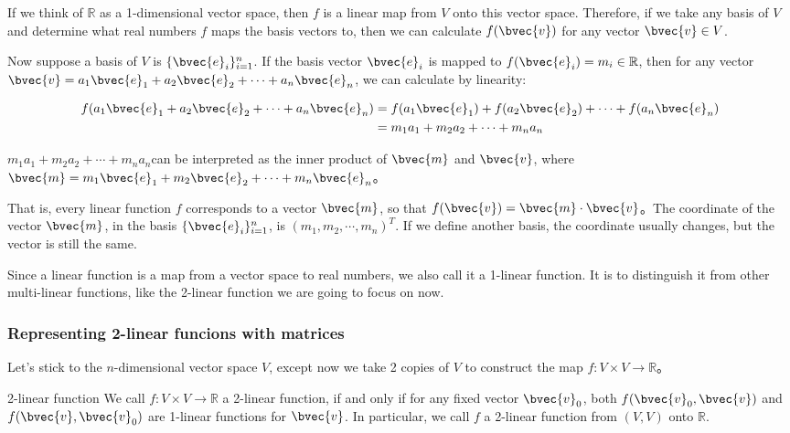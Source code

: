 If we think of $\mathbb{R}$ as a 1-dimensional vector space, then $f$ is a linear map from $V$ onto this vector space. Therefore, if we take any basis of $V$ and determine what real numbers $f$ maps the basis vectors to, then we can calculate $f(\bvec{v})$ for any vector $\bvec{v}\in V$. 

Now suppose a basis of $V$ is $\{\bvec{e}_i\}^n_{i=1}$. If the basis vector $\bvec{e}_i$ is mapped to $f(\bvec{e}_i)=m_i\in\mathbb{R}$, then for any vector $\bvec{v}=a_1\bvec{e}_1+a_2\bvec{e}_2+\cdots+a_n\bvec{e}_n$, we can calculate by linearity: 

\begin{equation}
\begin{aligned}
f(a_1\bvec{e}_1+a_2\bvec{e}_2+\cdots+a_n\bvec{e}_n)&=f(a_1\bvec{e}_1)+f(a_2\bvec{e}_2)+\cdots+f(a_n\bvec{e}_n)\\&=m_1a_1+m_2a_2+\cdots+m_na_n
\end{aligned}
\end{equation}


$m_1a_1+m_2a_2+\cdots+m_na_n$can be interpreted as the inner product of $\bvec{m}$ and $\bvec{v}$, where$\bvec{m}=m_1\bvec{e}_1+m_2\bvec{e}_2+\cdots+m_n\bvec{e}_n$。

That is, every linear function $f$ corresponds to a vector $\bvec{m}$, so that $f(\bvec{v})=\bvec{m}\cdot\bvec{v}$。The coordinate of the vector $\bvec{m}$, in the basis $\{\bvec{e}_i\}_{i=1}^n$, is $(m_1, m_2, \cdots, m_n)^T$. If we define another basis, the coordinate usually changes, but the vector is still the same. 

Since a linear function is a map from a vector space to real numbers, we also call it a 1-linear function. It is to distinguish it from other multi-linear functions, like the 2-linear function we are going to focus on now. 

\subsubsection{Representing 2-linear funcions with matrices}

Let's stick to the $n$-dimensional vector space $V$, except now we take 2 copies of $V$ to construct the map $f:V\times V\rightarrow\mathbb{R}$。

\begin{definition}{2-linear function}
We call $f:V\times V\rightarrow\mathbb{R}$ a 2-linear function, if and only if for any fixed vector $\bvec{v}_0$, both $f(\bvec{v}_0, \bvec{v})$ and $f(\bvec{v}, \bvec{v}_0)$ are 1-linear functions for $\bvec{v}$. In particular, we call $f$ a 2-linear function from $(V, V)$ onto $\mathbb{R}$. 
\end{definition}

